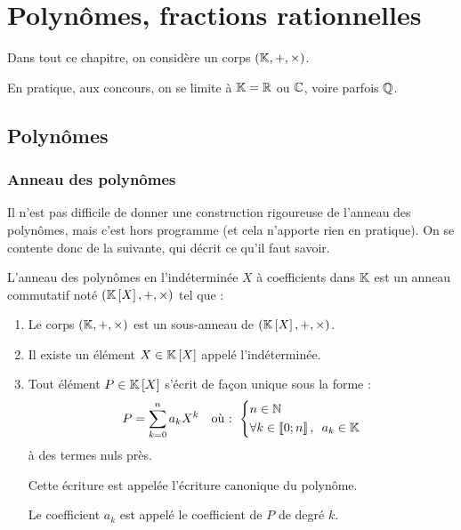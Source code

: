 \chapter{Polynômes, fractions rationnelles}

\minitoc

Dans tout ce chapitre, on considère un corps \(\corps{\K}\).

En pratique, aux concours, on se limite à \(\mathbb{K}=\mathbb{R}\) ou \(\mathbb{C}\), voire parfois \(\mathbb{Q}\).

\section{Polynômes}

\subsection{Anneau des polynômes}

Il n'est pas difficile de donner une construction rigoureuse de l'anneau des polynômes, mais c'est hors programme (et cela n'apporte rien en pratique). On se contente donc de la  suivante, qui décrit ce qu'il faut savoir.

\begin{defi}
L'anneau des polynômes en l'indéterminée \(X\) à coefficients dans \(\mathbb{K}\) est un anneau commutatif noté \(\anneau{\poly}\) tel que :

\begin{enumerate}
\item Le corps \(\corps{\K}\) est un sous-anneau de \(\anneau{\poly}\). \\

\item Il existe un élément \(X\in\poly\) appelé l'indéterminée. \\

\item Tout élément \(P\in\poly\) s'écrit de façon unique sous la forme : \[P=\sum_{k=0}^{n}a_kX^k\quad\text{où : }\begin{dcases}n\in\N \\ \quantifs{\forall k\in\interventierii{0}{n}}a_k\in\K\end{dcases}\] à des termes nuls près.

Cette écriture est appelée l'écriture canonique du polynôme.

Le coefficient \(a_k\) est appelé le coefficient de \(P\) de degré \(k\). \\
\end{enumerate}
\end{defi}

